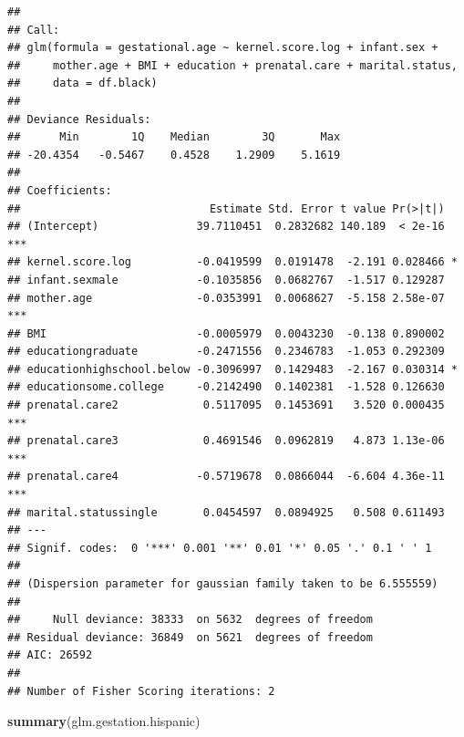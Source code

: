 \documentclass[
  12pt,
]{article}
\newenvironment{Shaded}{\begin{snugshade}}{\end{snugshade}}
\newcommand{\KeywordTok}[1]{\textcolor[rgb]{0.13,0.29,0.53}{\textbf{#1}}}
\newcommand{\NormalTok}[1]{#1}
\begin{document}
\begin{verbatim}
## 
## Call:
## glm(formula = gestational.age ~ kernel.score.log + infant.sex + 
##     mother.age + BMI + education + prenatal.care + marital.status, 
##     data = df.black)
## 
## Deviance Residuals: 
##      Min        1Q    Median        3Q       Max  
## -20.4354   -0.5467    0.4528    1.2909    5.1619  
## 
## Coefficients:
##                             Estimate Std. Error t value Pr(>|t|)    
## (Intercept)               39.7110451  0.2832682 140.189  < 2e-16 ***
## kernel.score.log          -0.0419599  0.0191478  -2.191 0.028466 *  
## infant.sexmale            -0.1035856  0.0682767  -1.517 0.129287    
## mother.age                -0.0353991  0.0068627  -5.158 2.58e-07 ***
## BMI                       -0.0005979  0.0043230  -0.138 0.890002    
## educationgraduate         -0.2471556  0.2346783  -1.053 0.292309    
## educationhighschool.below -0.3096997  0.1429483  -2.167 0.030314 *  
## educationsome.college     -0.2142490  0.1402381  -1.528 0.126630    
## prenatal.care2             0.5117095  0.1453691   3.520 0.000435 ***
## prenatal.care3             0.4691546  0.0962819   4.873 1.13e-06 ***
## prenatal.care4            -0.5719678  0.0866044  -6.604 4.36e-11 ***
## marital.statussingle       0.0454597  0.0894925   0.508 0.611493    
## ---
## Signif. codes:  0 '***' 0.001 '**' 0.01 '*' 0.05 '.' 0.1 ' ' 1
## 
## (Dispersion parameter for gaussian family taken to be 6.555559)
## 
##     Null deviance: 38333  on 5632  degrees of freedom
## Residual deviance: 36849  on 5621  degrees of freedom
## AIC: 26592
## 
## Number of Fisher Scoring iterations: 2
\end{verbatim}

\begin{Shaded}
\begin{Highlighting}[]
\KeywordTok{summary}\NormalTok{(glm.gestation.hispanic)}
\end{Highlighting}
\end{Shaded}
\end{document}
